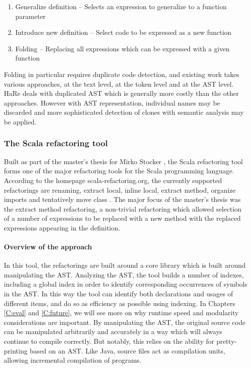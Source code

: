 \begin{enumerate}
\item Generalize definition -- Selects an expression to generalize to a function parameter
\item Introduce new definition -- Select code to be expressed as a new function
\item Folding -- Replacing all expressions which can be expressed with a given function
\end{enumerate}

Folding in particular requires duplicate code detection, and existing work takes various approaches, at the text level, at the token level and at the AST level. HaRe deals with duplicated AST which is generally more costly than the other approaches. However with AST representation, individual names may be discarded and more sophisticated detection of clones with semantic analysis may be applied. 

\subsubsection{The Scala refactoring tool}
Built as part of the master's thesis for Mirko Stocker \cite{stocker2010scala}, the Scala refactoring tool forms one of the major refactoring tools for the Scala programming language. According to the homepage scala-refactoring.org, the currently supported refactorings are renaming, extract local, inline local, extract method, organize imports and tentatively move class \cite{scala15}. The major focus of the master's thesis was the extract method refactoring, a non-trivial refactoring which allowed selection of a number of expressions to be replaced with a new method with the replaced expressions appearing in the definition.

\paragraph{Overview of the approach}
In this tool, the refactorings are built around a core library which is built around manipulating the AST. Analyzing the AST, the tool builds a number of indexes, including a global index in order to identify corresponding occurrences of symbols in the AST. In this way the tool can identify both declarations and usages of different items, and do so as efficiency as possible using indexing. In Chapters \ref{C:eval} and \ref{C:future}, we will see more on why runtime speed and modularity considerations are important. By manipulating the AST, the original source code can be manipulated arbitrarily and accurately in a way which will always continue to compile correctly. But notably, this relies on the ability for pretty-printing based on an AST.  Like Java, source files act as compilation units, allowing incremental compilation of programs.

